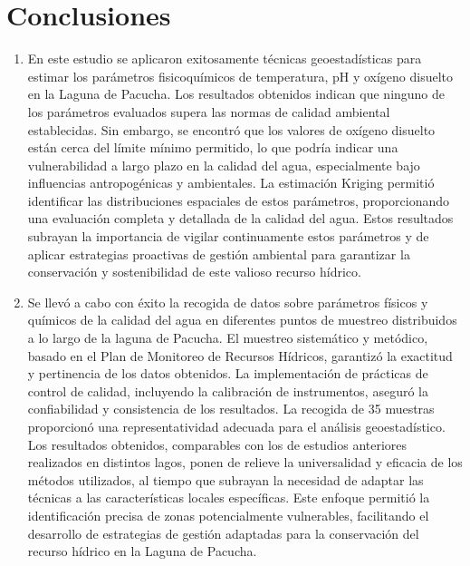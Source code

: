 \section{Conclusiones}
\begin{enumerate}
    \item En este estudio se aplicaron exitosamente técnicas geoestadísticas para estimar los parámetros fisicoquímicos de temperatura, pH y oxígeno disuelto en la Laguna de Pacucha. Los resultados obtenidos indican que ninguno de los parámetros evaluados supera las normas de calidad ambiental establecidas. Sin embargo, se encontró que los valores de oxígeno disuelto están cerca del límite mínimo permitido, lo que podría indicar una vulnerabilidad a largo plazo en la calidad del agua, especialmente bajo influencias antropogénicas y ambientales. La estimación Kriging permitió identificar las distribuciones espaciales de estos parámetros, proporcionando una evaluación completa y detallada de la calidad del agua. Estos resultados subrayan la importancia de vigilar continuamente estos parámetros y de aplicar estrategias proactivas de gestión ambiental para garantizar la conservación y sostenibilidad de este valioso recurso hídrico.
    \item Se llevó a cabo con éxito la recogida de datos sobre parámetros físicos y químicos de la calidad del agua en diferentes puntos de muestreo distribuidos a lo largo de la laguna de Pacucha. El muestreo sistemático y metódico, basado en el Plan de Monitoreo de Recursos Hídricos, garantizó la exactitud y pertinencia de los datos obtenidos. La implementación de prácticas de control de calidad, incluyendo la calibración de instrumentos, aseguró la confiabilidad y consistencia de los resultados. La recogida de 35 muestras proporcionó una representatividad adecuada para el análisis geoestadístico. Los resultados obtenidos, comparables con los de estudios anteriores realizados en distintos lagos, ponen de relieve la universalidad y eficacia de los métodos utilizados, al tiempo que subrayan la necesidad de adaptar las técnicas a las características locales específicas. Este enfoque permitió la identificación precisa de zonas potencialmente vulnerables, facilitando el desarrollo de estrategias de gestión adaptadas para la conservación del recurso hídrico en la Laguna de Pacucha.

\end{enumerate}
